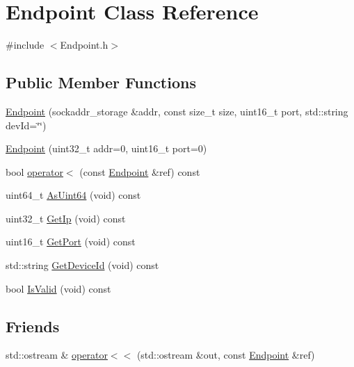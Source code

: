 \hypertarget{class_endpoint}{\section{Endpoint Class Reference}
\label{class_endpoint}
}


{\ttfamily \#include $<$Endpoint.\-h$>$}

\subsection*{Public Member Functions}
\begin{DoxyCompactItemize}
\item 
\hyperlink{class_endpoint_ad855b9615cd2a35d122cef1f938f85a6}{Endpoint} (sockaddr\-\_\-storage \&addr, const size\-\_\-t size, uint16\-\_\-t port, std\-::string dev\-Id=\char`\"{}\char`\"{})
\item 
\hyperlink{class_endpoint_aea663fa6d602bd9b0ee36a0a20c10515}{Endpoint} (uint32\-\_\-t addr=0, uint16\-\_\-t port=0)
\item 
bool \hyperlink{class_endpoint_a1ebaa89afaae9dd7b1305532634c2871}{operator$<$} (const \hyperlink{class_endpoint}{Endpoint} \&ref) const 
\item 
uint64\-\_\-t \hyperlink{class_endpoint_a2d0912e7fa4ae54f9402d6833a6d3ae6}{As\-Uint64} (void) const 
\item 
uint32\-\_\-t \hyperlink{class_endpoint_a5618578a2aea0258faac2ec166809f61}{Get\-Ip} (void) const 
\item 
uint16\-\_\-t \hyperlink{class_endpoint_ab314920c2ea906136bb10db9a8b19d9f}{Get\-Port} (void) const 
\item 
std\-::string \hyperlink{class_endpoint_a9fa08af06fd1ffd733fe6e1444cf2fa9}{Get\-Device\-Id} (void) const 
\item 
bool \hyperlink{class_endpoint_a514014f7d1ee63a7c5a3ed7c8b129526}{Is\-Valid} (void) const 
\end{DoxyCompactItemize}
\subsection*{Friends}
\begin{DoxyCompactItemize}
\item 
std\-::ostream \& \hyperlink{class_endpoint_af3f74b3b812453bb6cc60400dfc0c82c}{operator$<$$<$} (std\-::ostream \&out, const \hyperlink{class_endpoint}{Endpoint} \&ref)
\end{DoxyCompactItemize}


